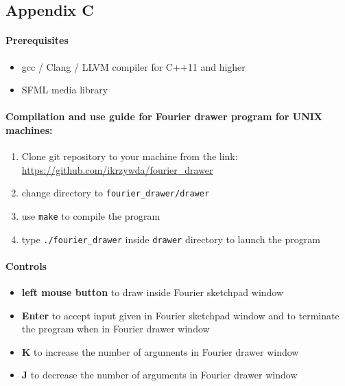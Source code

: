 \documentclass[titlepage]{article}
\begin{document}
\subsection{Appendix C}

    \paragraph{Prerequisites}
    \begin{itemize}
        \item gcc / Clang / LLVM compiler for C++11 and higher
        \item SFML media library
    \end{itemize}

    \paragraph{Compilation and use guide for Fourier drawer program for UNIX machines:}
    \begin{enumerate}
        \item Clone git repository to your machine from the link:
            \url{https://github.com/ikrzywda/fourier\_drawer}
        \item change directory to \texttt{fourier\_drawer/drawer}
        \item use \texttt{make} to compile the program
        \item type \texttt{./fourier\_drawer} inside \texttt{drawer} directory to launch
            the program
    \end{enumerate}

    \paragraph{Controls}
    \begin{itemize}
        \item \textbf{left mouse button} to draw inside Fourier sketchpad window
        \item \textbf{Enter} to accept input given in Fourier sketchpad window
            and to terminate the program when in Fourier drawer window
        \item \textbf{K} to increase the number of arguments in Fourier drawer 
            window
        \item \textbf{J} to decrease the number of arguments in Fourier drawer 
            window
    \end{itemize}
\end{document}
